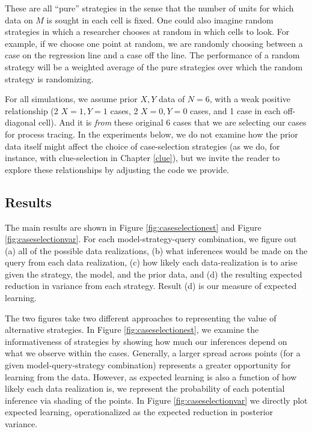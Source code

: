 \documentclass[
  12pt,
]{book}
\begin{document}
These are all ``pure'' strategies in the sense that the number of units for which data on \(M\) is sought in each cell is fixed. One could also imagine random strategies in which a researcher chooses at random in which cells to look. For example, if we choose one point at random, we are randomly choosing between a case on the regression line and a case off the line. The performance of a random strategy will be a weighted average of the pure strategies over which the random strategy is randomizing.

For all simulations, we assume prior \(X,Y\) data of \(N=6\), with a weak positive relationship (2 \(X=1, Y=1\) cases, 2 \(X=0, Y=0\) cases, and 1 case in each off-diagonal cell). And it is \emph{from} these original 6 cases that we are selecting our cases for process tracing. In the experiments below, we do not examine how the prior data itself might affect the choice of case-selection strategies (as we do, for instance, with clue-selection in Chapter \ref{clue}), but we invite the reader to explore these relationships by adjusting the code we provide.

\hypertarget{results-1}{%
\subsection{Results}\label{results-1}}

The main results are shown in Figure \ref{fig:caseselectionest} and Figure \ref{fig:caseselectionvar}. For each model-strategy-query combination, we figure out (a) all of the possible data realizations, (b) what inferences would be made on the query from each data realization, (c) how likely each data-realization is to arise given the strategy, the model, and the prior data, and (d) the resulting expected reduction in variance from each strategy. Result (d) is our measure of expected learning.

The two figures take two different approaches to representing the value of alternative strategies. In Figure \ref{fig:caseselectionest}, we examine the informativeness of strategies by showing how much our inferences depend on what we observe within the cases. Generally, a larger spread across points (for a given model-query-strategy combination) represents a greater opportunity for learning from the data. However, as expected learning is also a function of how likely each data realization is, we represent the probability of each potential inference via shading of the points. In Figure \ref{fig:caseselectionvar} we directly plot expected learning, operationalized as the expected reduction in posterior variance.
\end{document}
